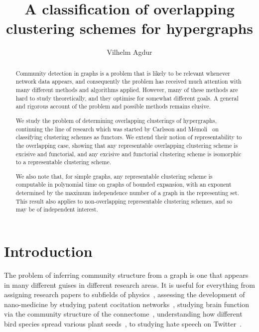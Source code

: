 \documentclass[a4paper,reqno,oneside]{article} %
\begin{document}

\title{A classification of overlapping clustering schemes for hypergraphs}
\author{Vilhelm Agdur}
\maketitle
\begin{abstract}
    Community detection in graphs is a problem that is likely to be relevant whenever network data appears, and consequently the problem has received much attention with many different methods and algorithms applied. However, many of these methods are hard to study theoretically, and they optimise for somewhat different goals. A general and rigorous account of the problem and possible methods remains elusive.

    We study the problem of determining overlapping clusterings of hypergraphs, continuing the line of research which was started by Carlsson and Mémoli~\cite{carlsson_memoli_2013} on classifying clustering schemes as functors. We extend their notion of representability to the overlapping case, showing that any representable overlapping clustering scheme is excisive and functorial, and any excisive and functorial clustering scheme is isomorphic to a representable clustering scheme.

    We also note that, for simple graphs, any representable clustering scheme is computable in polynomial time on graphs of bounded expansion, with an exponent determined by the maximum independence number of a graph in the representing set. This result also applies to non-overlapping representable clustering schemes, and so may be of independent interest.
\end{abstract}

\section{Introduction}

The problem of inferring community structure from a graph is one that appears in many different guises in different research areas. It is useful for everything from assigning research papers to subfields of physics~\cite{community_structure_physrev}, assessing the development of nano-medicine by studying patent cocitation networks~\cite{canadian_nanotech_patents}, studying brain function via the community structure of the connectome~\cite{connectome_analysis}, understanding how different bird species spread various plant seeds~\cite{bird_seed_networks}, to studying hate speech on Twitter~\cite{twitter_hate_speech}.
\end{document}

